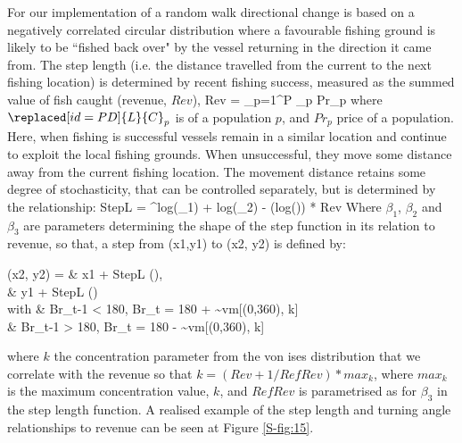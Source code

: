 \documentclass[review]{elsarticle}
\let\oldequation\equation
\let\oldendequation\endequation
\renewenvironment{equation}
 {\linenomathNonumbers\oldequation}
 {\oldendequation\endlinenomath}
\begin{document}
For our implementation of a random walk directional change is based on a
negatively correlated circular distribution where a favourable fishing ground
is likely to be ``fished back over" by the vessel returning in the direction it
came from.  The step length (i.e. the distance travelled from the current to
the next fishing location) is determined by  recent
fishing success, measured as the summed value of fish caught (revenue, $Rev$),
\begin{equation}
Rev = \sum_{p=1}^{P} _{p} \cdot Pr_{p} 
\end{equation}
where $\replaced[id=PD]{L}{C}_{p}$ is  of a
population $p$, and $Pr_{p}$ price of a population. Here, when fishing is
successful vessels remain in a similar location and continue to exploit the
local fishing grounds. When unsuccessful, they move some distance away from
the current fishing location.  The movement distance retains some degree of
stochasticity, that can be controlled separately, but is determined by the
relationship: 
\begin{equation}
	StepL = ^{log(\beta_{1}) + log(\beta_{2}) -
		(log())} * Rev
\end{equation}
Where $\beta_{1}$, $\beta_{2}$ and $\beta_{3}$ are parameters determining the
shape of the step function in its relation to revenue, so that, a step from
(x1,y1) to (x2, y2) is defined by:
\begin{equation}
	\begin{split}
 (x2, y2) =  & x1 + StepL \cdot \cos (), \\
             & y1 + StepL \cdot \sin () \\	
 with  \hspace{0.5cm}     & Br_{t-1} < 180, Br_{t} = 180 + \sim vm[(0,360), k] \\
 			  & Br_{t-1} > 180, Br_{t} = 180 - \sim vm[(0,360), k] \\
	\end{split}
\end{equation}
where $k$ the concentration parameter from the von ises
distribution that we correlate with the revenue so that $k = (Rev + 1 /
RefRev) * max_{k}$, where $max_{k}$ is the maximum concentration value, $k$,
and $RefRev$ is parametrised as for $\beta_{3}$ in the step length function. A
realised example of the step length and turning angle relationships to revenue
can be seen at Figure \ref{S-fig:15}.
\end{document}
